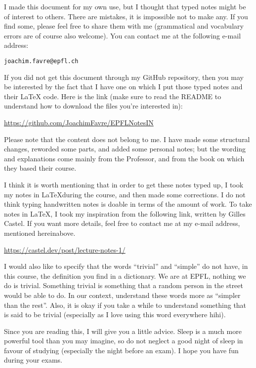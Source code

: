 I made this document for my own use, but I thought that typed notes might be of interest to others. There are mistakes, it is impossible not to make any. If you find some, please feel free to share them with me (grammatical and vocabulary errors are of course also welcome). You can contact me at the following e-mail address:
\begin{center}
    \texttt{joachim.favre@epfl.ch}
\end{center}

If you did not get this document through my GitHub repository, then you may be interested by the fact that I have one on which I put those typed notes and their LaTeX code. Here is the link (make sure to read the README to understand how to download the files you're interested in):
\begin{center}
    \url{https://github.com/JoachimFavre/EPFLNotesIN}
\end{center}

Please note that the content does not belong to me. I have made some structural changes, reworded some parts, and added some personal notes; but the wording and explanations come mainly from the Professor, and from the book on which they based their course.

I think it is worth mentioning that in order to get these notes typed up, I took my notes in \LaTeX during the course, and then made some corrections. I do not think typing handwritten notes is doable in terms of the amount of work. To take notes in \LaTeX, I took my inspiration from the following link, written by Gilles Castel. If you want more details, feel free to contact me at my e-mail address, mentioned hereinabove.
\begin{center}
    \url{https://castel.dev/post/lecture-notes-1/}
\end{center}

I would also like to specify that the words ``trivial'' and ``simple'' do not have, in this course, the definition you find in a dictionary. We are at EPFL, nothing we do is trivial. Something trivial is something that a random person in the street would be able to do. In our context, understand these words more as ``simpler than the rest''. Also, it is okay if you take a while to understand something that is said to be trivial (especially as I love using this word everywhere hihi).

Since you are reading this, I will give you a little advice. Sleep is a much more powerful tool than you may imagine, so do not neglect a good night of sleep in favour of studying (especially the night before an exam). I hope you have fun during your exams.
